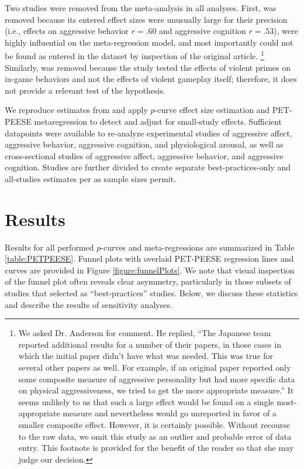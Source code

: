 \documentclass[man]{apa6}
\begin{document}
Two studies were removed from the meta-analysis in all analyses. First, \citet[study 1]{Matsuzaki:etal:2006} was removed because its entered effect sizes were unusually large for their precision (i.e., effects on aggressive behavior $r = .60$ and aggressive cognition $r = .53$), were highly influential on the meta-regression model, and most importantly could not be found as entered in the \citet{Anderson:etal:2010} dataset by inspection of the original article. \footnote{We asked Dr. Anderson for comment. He replied, ``The Japanese team reported additional results for a number of their papers, in those cases in which the initial paper didn't have what was needed. This was true for several other papers as well. For example, if an original paper reported only some composite measure of aggressive personality but had more specific data on physical aggressiveness, we tried to get the more appropriate measure.'' It seems unlikely to us that such a large effect would be found on a single most-appropriate measure and nevertheless would go unreported in favor of a smaller composite effect. However, it is certainly possible. Without recourse to the raw data, we omit this study as an outlier and probable error of data entry. This footnote is provided for the benefit of the reader so that she may judge our decision.}
Similarly, \citet{Panee:Ballard:2002} was removed because the study tested the effects of violent primes on in-game behaviors and not the effects of violent gameplay itself; therefore, it does not provide a relevant test of the hypothesis. %

We reproduce estimates from \citet{Anderson:etal:2010} and apply $p$-curve effect size estimation and PET-PEESE metaregression to detect and adjust for small-study effects. Sufficient datapoints were available to re-analyze experimental studies of aggressive affect, aggressive behavior, aggressive cognition, and physiological arousal, as well as cross-sectional studies of aggressive affect, aggressive behavior, and aggressive cognition. Studies are further divided to create separate best-practices-only and all-studies estimates per \citet{Anderson:etal:2010} as sample sizes permit. 

\section{Results}
Results for all performed $p$-curves and meta-regressions are summarized in Table \ref{table:PETPEESE}. 
Funnel plots with overlaid PET-PEESE regression lines and curves are provided in Figure \ref{figure:funnelPlots}. We note that visual inspection of the funnel plot often reveals clear asymmetry, particularly in those subsets of studies that \citet{Anderson:etal:2010} selected as ``best-practices'' studies.
Below, we discuss these statistics and describe the results of sensitivity analyses.
\end{document}
